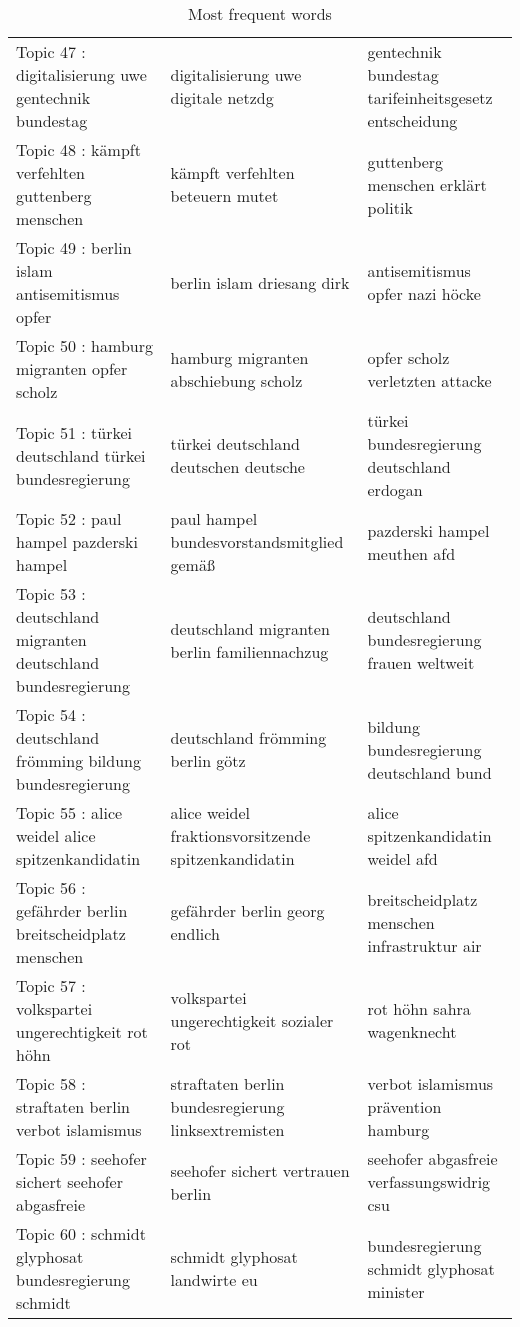 \begin{table}[ht]
\begin{tabular}{lll}
  Topic 47 : digitalisierung uwe gentechnik bundestag & digitalisierung uwe digitale netzdg & gentechnik bundestag tarifeinheitsgesetz entscheidung \\ 
  Topic 48 : kämpft verfehlten guttenberg menschen & kämpft verfehlten beteuern mutet & guttenberg menschen erklärt politik \\ 
  Topic 49 : berlin islam antisemitismus opfer & berlin islam driesang dirk & antisemitismus opfer nazi höcke \\ 
  Topic 50 : hamburg migranten opfer scholz & hamburg migranten abschiebung scholz & opfer scholz verletzten attacke \\ 
  Topic 51 : türkei deutschland türkei bundesregierung & türkei deutschland deutschen deutsche & türkei bundesregierung deutschland erdogan \\ 
  Topic 52 : paul hampel pazderski hampel & paul hampel bundesvorstandsmitglied gemäß & pazderski hampel meuthen afd \\ 
  Topic 53 : deutschland migranten deutschland bundesregierung & deutschland migranten berlin familiennachzug & deutschland bundesregierung frauen weltweit \\ 
  Topic 54 : deutschland frömming bildung bundesregierung & deutschland frömming berlin götz & bildung bundesregierung deutschland bund \\ 
  Topic 55 : alice weidel alice spitzenkandidatin & alice weidel fraktionsvorsitzende spitzenkandidatin & alice spitzenkandidatin weidel afd \\ 
  Topic 56 : gefährder berlin breitscheidplatz menschen & gefährder berlin georg endlich & breitscheidplatz menschen infrastruktur air \\ 
  Topic 57 : volkspartei ungerechtigkeit rot höhn & volkspartei ungerechtigkeit sozialer rot & rot höhn sahra wagenknecht \\ 
  Topic 58 : straftaten berlin verbot islamismus & straftaten berlin bundesregierung linksextremisten & verbot islamismus prävention hamburg \\ 
  Topic 59 : seehofer sichert seehofer abgasfreie & seehofer sichert vertrauen berlin & seehofer abgasfreie verfassungswidrig csu \\ 
  Topic 60 : schmidt glyphosat bundesregierung schmidt & schmidt glyphosat landwirte eu & bundesregierung schmidt glyphosat minister \\ 
   \hline
\end{tabular}
\caption{Most frequent words} 
\end{table}
